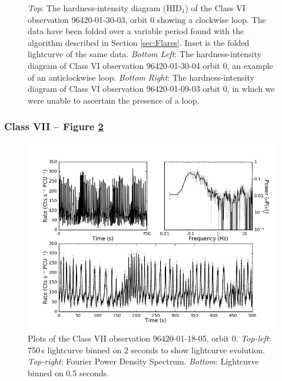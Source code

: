 \begin{figure}
    \captionsetup{singlelinecheck=off}
    \caption{\textit{Top}: The hardness-intensity diagram (HID$_1$) of the Class VI observation 96420-01-30-03, orbit 0 showing a clockwise loop.  The data have been folded over a variable period found with the algorithm described in Section \ref{sec:Flares}.  Inset is the folded lightcurve of the same data. \textit{Bottom Left}: The hardness-intensity diagram of Class VI observation 96420-01-30-04 orbit 0, an example of an anticlockwise loop.  \textit{Bottom Right}: The hardness-intensity diagram of Class VI observation 96420-01-09-03 orbit 0, in which we were unable to ascertain the presence of a loop.}
   \label{fig:LoopVI}
\end{figure}

\subsubsection{Class VII -- Figure \ref{fig:Nmulti}}

\begin{figure}
    \includegraphics[width=0.8\columnwidth, trim = 0.6cm 0 3.9cm 0]{images/Nmulti.png}
    \captionsetup{singlelinecheck=off}
    \caption{Plots of the Class VII observation 96420-01-18-05, orbit 0.  \textit{Top-left}: 750\,s lightcurve binned on 2 seconds to show lightcurve evolution.  \textit{Top-right}: Fourier Power Density Spectrum.  \textit{Bottom}: Lightcurve binned on 0.5 seconds.}
   \label{fig:Nmulti}
\end{figure}

